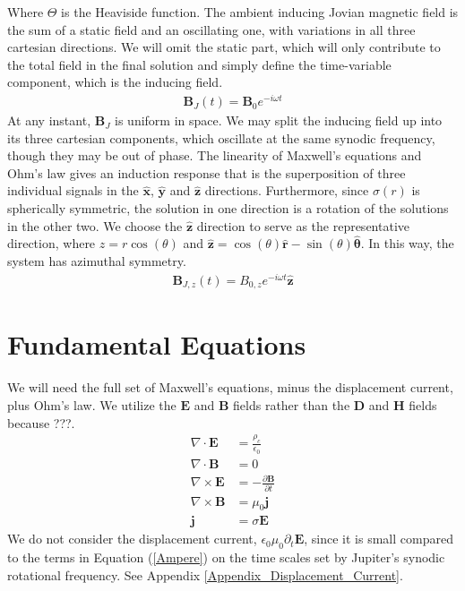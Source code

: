 \documentclass{article}
\begin{document}
Where $\Theta$ is the Heaviside function. The ambient inducing Jovian magnetic field is the sum of a static field and an oscillating one, with variations in all three cartesian directions. We will omit the static part, which will only contribute to the total field in the final solution and simply define the time-variable component, which is the inducing field.
\begin{align}
    \mathbf{B}_J(t) = \mathbf{B}_{0}e^{-i\omega t} \label{inducingfield}
\end{align}
At any instant, $\mathbf{B}_J$ is uniform in space. We may split the inducing field up into its three cartesian components, which oscillate at the same synodic frequency, though they may be out of phase. The linearity of Maxwell's equations and Ohm's law gives an induction response that is the superposition of three individual signals in the $\mathbf{\hat{x}}$, $\mathbf{\hat{y}}$ and $\mathbf{\hat{z}}$ directions. Furthermore, since $\sigma(r)$ is spherically symmetric, the solution in one direction is a rotation of the solutions in the other two. We choose the $\mathbf{\hat{z}}$ direction to serve as the representative direction, where $z=r\cos(\theta)$ and $\mathbf{\hat{z}} = \cos(\theta)\mathbf{\hat{r}} - \sin(\theta)\boldsymbol{\hat{\theta}}$. In this way, the system has azimuthal symmetry.
\begin{align}
    \mathbf{B}_{J,z}(t) = B_{0,z}e^{-i\omega t}\mathbf{\hat{z}}
\end{align}

\section{Fundamental Equations}
We will need the full set of Maxwell's equations, minus the displacement current, plus Ohm's law. We utilize the $\mathbf{E}$ and $\mathbf{B}$ fields rather than the $\mathbf{D}$ and $\mathbf{H}$ fields because ???.
\begin{align}
    \nabla\cdot\mathbf{E} &= \frac{\rho_c}{\epsilon_0} \label{Gauss} \\
    \nabla\cdot\mathbf{B} &= 0 \label{DivB} \\
    \nabla\times\mathbf{E} &= -\frac{\partial\mathbf{B}}{\partial t} \label{Faraday} \\
    \nabla\times\mathbf{B} &= \mu_0\mathbf{j} \label{Ampere} \\
    \mathbf{j} &= \sigma\mathbf{E} \label{Ohm}
\end{align}
We do not consider the displacement current, $\epsilon_0\mu_0\partial_t\mathbf{E}$, since it is small compared to the terms in Equation (\ref{Ampere}) on the time scales set by Jupiter's synodic rotational frequency. See Appendix \ref{Appendix_Displacement_Current}.
\end{document}
